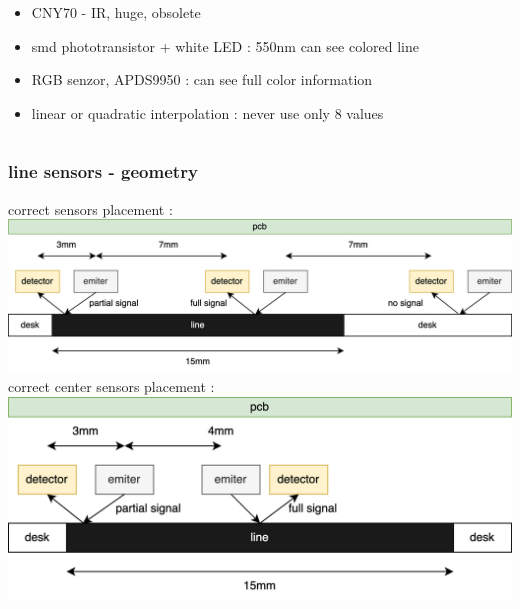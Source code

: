 \documentclass{beamer}
\begin{document}
\begin{frame}
\begin{columns}
    \begin{column}{0.5\textwidth}
      \begin{itemize}
        \item CNY70 - IR, huge, obsolete
        \item smd phototransistor + white LED : 550nm can see colored line
        \item RGB senzor, APDS9950 : can see full color information
        \item linear or quadratic interpolation : never use only 8 values
      \end{itemize}
    \end{column}

  \end{columns}

\end{frame}


\begin{frame}

  \frametitle{\bf line sensors - geometry}
  correct sensors placement : \\
  \includegraphics[scale=0.6]{../images/sensors/sensor-ls_0.png}
  \\
  correct center sensors placement :  \\
  \includegraphics[scale=0.6]{../images/sensors/sensor-ls_1.png}

\end{frame}
\end{document}
